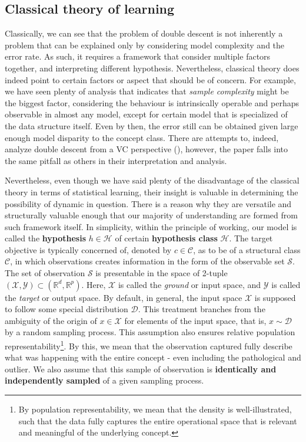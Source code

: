 \documentclass[
  journal=largetwo,
  year=2025,
  volume=37,
]{cup-journal}
\begin{document}
\subsection{Classical theory of learning}

Classically, we can see that the problem of double descent is not inherently a problem that can be explained only by considering model complexity and the error rate. As such, it requires a framework that consider multiple factors together, and interpreting different hypothesis. Nevertheless, classical theory does indeed point to certain factors or aspect that should be of concern. For example, we have seen plenty of analysis that indicates that \textit{sample complexity} might be the biggest factor, considering the behaviour is intrinsically operable and perhaps observable in almost any model, except for certain model that is specialized of the data structure itself. Even by then, the error still can be obtained given large enough model disparity to the concept class. There are attempts to, indeed, analyze double descent from a VC perspective (\cite{lee2022vctheoreticalexplanationdouble}), however, the paper falls into the same pitfall as others in their interpretation and analysis. 

Nevertheless, even though we have said plenty of the disadvantage of the classical theory in terms of statistical learning, their insight is valuable in determining the possibility of dynamic in question. There is a reason why they are versatile and structurally valuable enough that our majority of understanding are formed from such framework itself. In simplicity, within the principle of working, our model is called the \textbf{hypothesis} $h\in \mathcal{H}$ of certain \textbf{hypothesis class} $\mathcal{H}$. The target objective is typically concerned of, denoted by $c\in\mathcal{C}$, as to be of a structural class $\mathcal{C}$, in which observations creates information in the form of the observable set $\mathcal{S}$. The set of observation $\mathcal{S}$ is presentable in the space of 2-tuple $(\mathcal{X},\mathcal{Y})\subset(\mathbb{R}^{d},\mathbb{R}^{p})$. Here, $\mathcal{X}$ is called the \textit{ground} or input space, and $\mathcal{Y}$ is called the \textit{target} or output space. By default, in general, the input space $\mathcal{X}$ is supposed to follow some special distribution $\mathcal{D}$. This treatment branches from the ambiguity of the origin of $x\in\mathcal{X}$ for elements of the input space, that is, $x\sim \mathcal{D}$ by a random sampling process. This assumption also ensures relative population representability\footnote{By population representability, we mean that the density is well-illustrated, such that the data fully captures the entire operational space that is relevant and meaningful of the underlying concept.}. By this, we mean that the observation captured fully describe what was happening with the entire concept - even including the pathological and outlier. We also assume that this sample of observation is \textbf{identically and independently sampled} of a given sampling process. 
\end{document}
